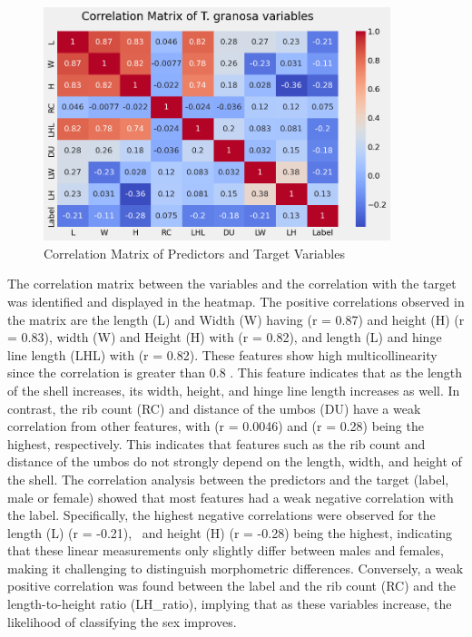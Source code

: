 \begin{figure}[!htbp]
	\centering
	\includegraphics[width=0.9\textwidth]{figures/corr_matrix.png}
	\caption{Correlation Matrix of Predictors and Target Variables}
\end{figure}

The correlation matrix between the variables and the correlation with the target was identified and displayed in the heatmap. The positive correlations observed in the matrix are the length (L) and Width (W) having (r = 0.87) and height (H) (r = 0.83), width (W) and Height (H) with (r = 0.82), and length (L) and hinge line length (LHL) with (r = 0.82). These features show high multicollinearity since the correlation is greater than 0.8 \cite{kim2019}. This feature indicates that as the length of the shell increases, its width, height, and hinge line length increases as well. In contrast, the rib count (RC) and distance of the umbos (DU) have a weak correlation from other features, with (r = 0.0046) and (r = 0.28) being the highest, respectively. This indicates that features such as the rib count and distance of the umbos do not strongly depend on the length, width, and height of the shell. 
The correlation analysis between the predictors and the target (label, male or female) showed that most features had a weak negative correlation with the label. Specifically, the highest negative correlations were observed for the length (L) (r = -0.21),  and height (H) (r = -0.28) being the highest, indicating that these linear measurements only slightly differ between males and females, making it challenging to distinguish morphometric differences. Conversely, a weak positive correlation was found between the label and the rib count (RC) and the length-to-height ratio (LH\_ratio), implying that as these variables increase, the likelihood of classifying the sex improves.

